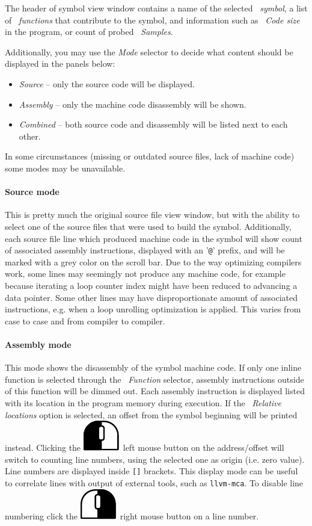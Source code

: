 \documentclass[hidelinks,titlepage,a4paper]{article}
\newcommand{\LMB}{\includegraphics[height=.8\baselineskip]{icons/lmb}}
\newcommand{\RMB}{\includegraphics[height=.8\baselineskip]{icons/rmb}}
\begin{document}
The header of symbol view window contains a name of the selected \emph{\faPuzzlePiece{}~symbol}, a list of \emph{\faSitemap{}~functions} that contribute to the symbol, and information such as \emph{\faWeightHanging{}~Code size} in the program, or count of probed \emph{\faEyeDropper{}~Samples}.

Additionally, you may use the \emph{Mode} selector to decide what content should be displayed in the panels below:

\begin{itemize}
\item \emph{Source} -- only the source code will be displayed.
\item \emph{Assembly} -- only the machine code disassembly will be shown.
\item \emph{Combined} -- both source code and disassembly will be listed next to each other.
\end{itemize}

In some circumstances (missing or outdated source files, lack of machine code) some modes may be unavailable.

\paragraph{Source mode}

This is pretty much the original source file view window, but with the ability to select one of the source files that were used to build the symbol. Additionally, each source file line which produced machine code in the symbol will show count of associated assembly instructions, displayed with an '\texttt{@}' prefix, and will be marked with a grey color on the scroll bar. Due to the way optimizing compilers work, some lines may seemingly not produce any machine code, for example because iterating a loop counter index might have been reduced to advancing a data pointer. Some other lines may have disproportionate amount of associated instructions, e.g. when a loop unrolling optimization is applied. This varies from case to case and from compiler to compiler.

\paragraph{Assembly mode}

This mode shows the disassembly of the symbol machine code. If only one inline function is selected through the \emph{\faSitemap{}~Function} selector, assembly instructions outside of this function will be dimmed out. Each assembly instruction is displayed listed with its location in the program memory during execution. If the \emph{\faSearchLocation{}~Relative locations} option is selected, an offset from the symbol beginning will be printed instead. Clicking the \LMB{}~left mouse button on the address/offset will switch to counting line numbers, using the selected one as origin (i.e. zero value). Line numbers are displayed inside \texttt{[]} brackets. This display mode can be useful to correlate lines with output of external tools, such as \texttt{llvm-mca}. To disable line numbering click the \RMB{}~right mouse button on a line number.
\end{document}
